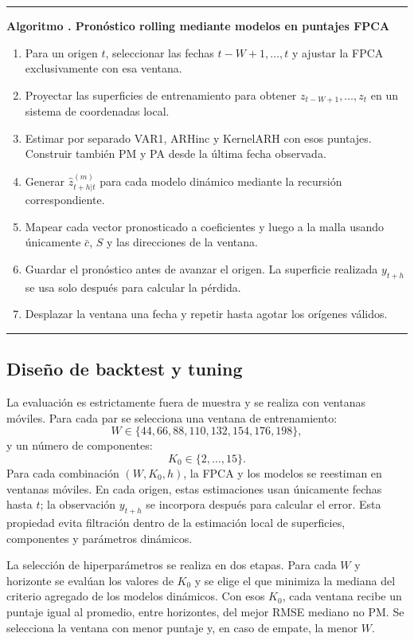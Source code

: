 \documentclass[a4paper,11pt]{article}
\newcounter{algoritmotesis}
\newenvironment{algoritmotesis}[1]{%
  \refstepcounter{algoritmotesis}%
  \par\medskip
  \noindent\begin{minipage}{\linewidth}
  \hrule\vspace{0.6em}
  \textbf{Algoritmo \thealgoritmotesis. #1}
  \begin{enumerate}
}{%
  \end{enumerate}
  \vspace{0.2em}\hrule
  \end{minipage}
  \par\medskip
}
\begin{document}
\begin{algoritmotesis}{Pronóstico rolling mediante modelos en puntajes FPCA}
  \item Para un origen \(t\), seleccionar las fechas \(t-W+1,\ldots,t\) y ajustar la FPCA exclusivamente con esa ventana.
  \item Proyectar las superficies de entrenamiento para obtener \(z_{t-W+1},\ldots,z_t\) en un sistema de coordenadas local.
  \item Estimar por separado VAR1, ARHinc y KernelARH con esos puntajes. Construir también PM y PA desde la última fecha observada.
  \item Generar \(\widehat z_{t+h|t}^{(m)}\) para cada modelo dinámico mediante la recursión correspondiente.
  \item Mapear cada vector pronosticado a coeficientes y luego a la malla usando únicamente \(\bar c\), \(S\) y las direcciones de la ventana.
  \item Guardar el pronóstico antes de avanzar el origen. La superficie realizada \(y_{t+h}\) se usa solo después para calcular la pérdida.
  \item Desplazar la ventana una fecha y repetir hasta agotar los orígenes válidos.
\end{algoritmotesis}

\subsection{Diseño de backtest y tuning}

La evaluación es estrictamente fuera de muestra y se realiza con ventanas móviles. Para cada par se selecciona una ventana de entrenamiento:
\[
  W\in\{44,66,88,110,132,154,176,198\},
\]
y un número de componentes:
\[
  K_0\in\{2,\ldots,15\}.
\]
Para cada combinación \((W,K_0,h)\), la FPCA y los modelos se reestiman en ventanas móviles. En cada origen, estas estimaciones usan únicamente fechas hasta \(t\); la observación \(y_{t+h}\) se incorpora después para calcular el error. Esta propiedad evita filtración dentro de la estimación local de superficies, componentes y parámetros dinámicos.

La selección de hiperparámetros se realiza en dos etapas. Para cada \(W\) y horizonte se evalúan los valores de \(K_0\) y se elige el que minimiza la mediana del criterio agregado de los modelos dinámicos. Con esos \(K_0\), cada ventana recibe un puntaje igual al promedio, entre horizontes, del mejor RMSE mediano no PM. Se selecciona la ventana con menor puntaje y, en caso de empate, la menor \(W\).
\end{document}
